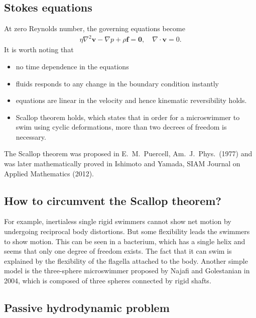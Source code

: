 \subsection{Stokes equations}

At zero Reynolds number, the governing equations become
\begin{align}
    \eta\nabla^2\mathbf{v}-\nabla p +\rho\mathbf{f}=\mathbf{0}, \quad
    \nabla\cdot\mathbf{v}=0.
\end{align}
It is worth noting that 
\begin{itemize}
    \item no time dependence in the equations
    \item fluids responds to any change in the boundary condition instantly
    \item equations are linear in the velocity and hence kinematic reversibility holds.
    \item Scallop theorem holds, which states that in order for a microswimmer to swim using cyclic deformations, more than two decrees of freedom is necessary.
\end{itemize}
The Scallop theorem was proposed in E.\ M.\ Puercell, Am.\ J.\ Phys.\ (1977) and was later mathematically proved in Ishimoto and Yamada, SIAM Journal on Applied Mathematics (2012).


\subsection{How to circumvent the Scallop theorem?}

For example, inertialess single rigid swimmers cannot show net motion by undergoing reciprocal body distortions. But some flexibility leads the swimmers to show motion. This can be seen in a bacterium, which has a single helix and seems that only one degree of freedom exists. 
The fact that it can swim is explained by the flexibility of the flagella attached to the body. Another simple model is the three-sphere microswimmer proposed by Najafi and Golestanian in 2004, which is composed of three spheres connected by rigid shafts.


\subsection{Passive hydrodynamic problem}


